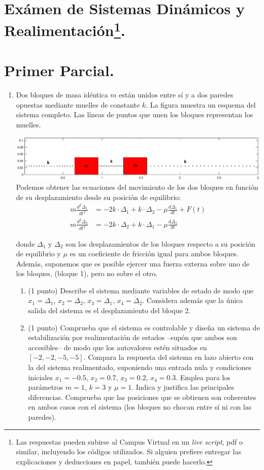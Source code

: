 \documentclass[10pt,a4paper]{article}
\begin{document}
\thispagestyle{fancy}

\section*{Exámen de Sistemas Dinámicos y Realimentación\footnote{Las respuestas pueden subirse al Campus Virtual en un \emph{live script}, pdf o similar, incluyendo los códigos utilizados. Si alguien prefiere entregar las explicaciones y deducciones en papel, también puede hacerlo.}.}

\section{Primer Parcial.}
\begin{enumerate}
\item Dos bloques de masa idéntica $m$ están unidos entre sí y a dos paredes opuestas mediante muelles de constante $k$. La figura muestra un esquema del sistema completo. Las líneas de puntos que unen los bloques representan los muelles.

\includegraphics[width=\textwidth]{bloquecitos.eps}
Podemos obtener las ecuaciones del movimiento de los dos bloques en función de su desplazamiento desde su posición de equilibrio:
\begin{align*}
m\frac{d^2\Delta_1}{dt^2} &= -2k\cdot \Delta_1 +k\cdot \Delta_2 -\mu\frac{d\Delta_1}{dt}+F(t)\\
m\frac{d^2\Delta_2}{dt^2} &= -2k\cdot \Delta_2 +k\cdot \Delta_1 -\mu\frac{d\Delta_2}{dt}
\end{align*}

donde $\Delta_1$ y $\Delta_2$ son los desplazamientos de los bloques respecto a su posición de equilibrio y $\mu$ es un coeficiente de fricción igual para ambos bloques. Además, suponemos que es posible ejercer una fuerza externa sobre uno de los bloques, (bloque 1), pero no sobre el otro.
\begin{enumerate}
\item (1 punto) Describe el sistema mediante variables de estado de modo que $x_1=\Delta_1$, $x_2 =\Delta_2$, $x_3=\dot{\Delta}_1$, $x_4=\dot{\Delta}_2$.
Considera además que la única salida del sistema es el desplazamiento del bloque 2.  
\item \label{b} (1 punto) Comprueba que el sistema es controlable y diseña un sistema de estabilización por realimentación de estados --supón que ambos son accesibles-- de modo que los autovalores estén situados en $[-2, -2, -5, -5]$. Compara la respuesta del sistema en lazo abierto con la del sistema realimentado, suponiendo una entrada nula y condiciones iniciales $x_1=-0.5$, $x_2=0.7$, $x_3=0.2$, $x_4=0.3$. Emplea para los parámetros  $m= 1$, $k=3$ y $\mu=1$. Indica y justifica las principales diferencias. Comprueba que las posiciones que se obtienen son coherentes en ambos casos con el sistema (los bloques no chocan entre sí ni con las paredes). 


\end{enumerate}
\end{enumerate}
\end{document}
